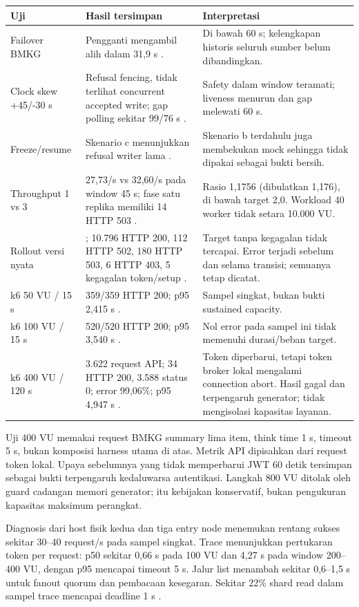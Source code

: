 \begin{longtable}{@{}P{3.4cm}P{6.2cm}P{5.9cm}@{}}
\toprule Uji & Hasil tersimpan & Interpretasi\\\midrule\endhead
Failover BMKG & Pengganti mengambil alih dalam 31,9 s . & Di bawah 60 s; kelengkapan historis seluruh sumber belum dibandingkan.\\
Clock skew +45/-30 s & Refusal fencing, tidak terlihat concurrent accepted write; gap polling sekitar 99/76 s . & Safety dalam window teramati; liveness menurun dan gap melewati 60 s.\\
Freeze/resume & Skenario c menunjukkan refusal writer lama . & Skenario b terdahulu juga membekukan mock sehingga tidak dipakai sebagai bukti bersih.\\
Throughput 1 vs 3 & 27,73/s vs 32,60/s pada window 45 s; fase satu replika memiliki 14 HTTP 503 . & Rasio 1,1756 (dibulatkan 1,176), di bawah target 2,0. Workload 40 worker tidak setara 10.000 VU.\\
Rollout versi nyata & ; 10.796 HTTP 200, 112 HTTP 502, 180 HTTP 503, 6 HTTP 403, 5 kegagalan token/setup . & Target tanpa kegagalan tidak tercapai. Error terjadi sebelum dan selama transisi; semuanya tetap dicatat.\\
k6 50 VU / 15 s & 359/359 HTTP 200; p95 2,415 s . & Sampel singkat, bukan bukti sustained capacity.\\
k6 100 VU / 15 s & 520/520 HTTP 200; p95 3,540 s . & Nol error pada sampel ini tidak memenuhi durasi/beban target.\\
k6 400 VU / 120 s & 3.622 request API; 34 HTTP 200, 3.588 status 0; error 99,06\%; p95 4,947 s . & Token diperbarui, tetapi token broker lokal mengalami connection abort. Hasil gagal dan terpengaruh generator; tidak mengisolasi kapasitas layanan.\\\bottomrule
\end{longtable}

Uji 400 VU memakai request BMKG summary lima item, think time 1 s, timeout 5 s, bukan komposisi harness utama di atas. Metrik API dipisahkan dari request token lokal. Upaya sebelumnya yang tidak memperbarui JWT 60 detik tersimpan sebagai bukti terpengaruh kedaluwarsa autentikasi. Langkah 800 VU ditolak oleh guard cadangan memori generator; itu kebijakan konservatif, bukan pengukuran kapasitas maksimum perangkat.

Diagnosis dari host fisik kedua dan tiga entry node menemukan rentang sukses sekitar 30--40 request/s pada sampel singkat. Trace menunjukkan pertukaran token per request: p50 sekitar 0,66 s pada 100 VU dan 4,27 s pada window 200--400 VU, dengan p95 mencapai timeout 5 s. Jalur list menambah sekitar 0,6--1,5 s untuk fanout quorum dan pembacaan kesegaran. Sekitar 22\% shard read dalam sampel trace mencapai deadline 1 s .

